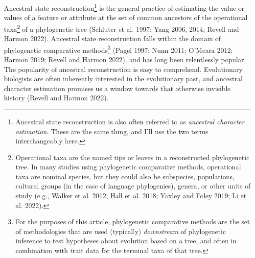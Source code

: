 \documentclass{article}
\begin{document}
Ancestral state reconstruction\footnote{Ancestral state reconstruction is also often referred to as \emph{ancestral character estimation}. These are the same thing, and I'll use the two terms interchangeably here.} is the general practice of estimating the value or values of a feature or attribute at the set of common ancestors of the operational taxa\footnote{Operational taxa are the named tips or leaves in a reconstructed phylogenetic tree. In many studies using phylogenetic comparative methods, operational taxa are nominal species, but they could also be subspecies, populations, cultural groups (in the case of language phylogenies), genera, or other units of study (e.g., Walker et al. 2012; Hall et al. 2018; Yaxley and Foley 2019; Li et al. 2022).} of a phylogenetic tree (Schluter et al. 1997; Yang 2006, 2014; Revell and Harmon 2022). Ancestral state reconstruction falls within the domain of phylogenetic comparative methods\footnote{For the purposes of this article, phylogenetic comparative methods are the set of methodologies that are used (typically) \emph{downstream} of phylogenetic inference to test hypotheses about evolution based on a tree, and often in combination with trait data for the terminal taxa of that tree.} (Pagel 1997; Nunn 2011; O'Meara 2012; Harmon 2019; Revell and Harmon 2022), and has long been relentlessly popular. The popularity of ancestral reconstruction is easy to comprehend. Evolutionary biologists are often inherently interested in the evolutionary past, and ancestral character estimation promises us a window towards that otherwise invisible history (Revell and Harmon 2022).
\end{document}
